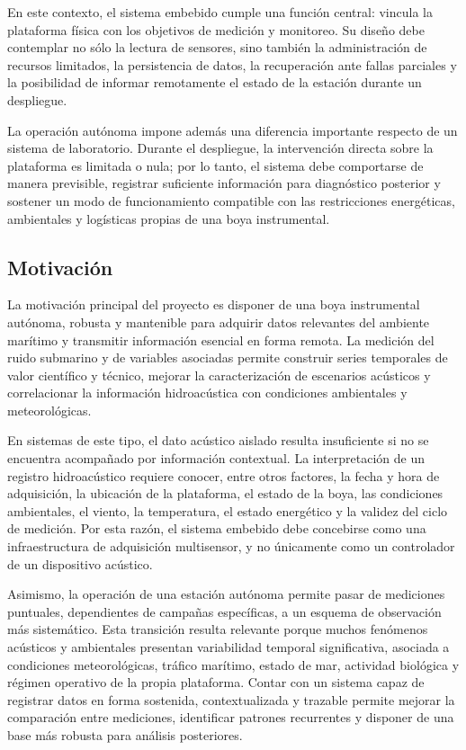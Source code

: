En este contexto, el sistema embebido cumple una función central: vincula la plataforma física con los objetivos de medición y monitoreo. Su diseño debe contemplar no sólo la lectura de sensores, sino también la administración de recursos limitados, la persistencia de datos, la recuperación ante fallas parciales y la posibilidad de informar remotamente el estado de la estación durante un despliegue.

La operación autónoma impone además una diferencia importante respecto de un sistema de laboratorio. Durante el despliegue, la intervención directa sobre la plataforma es limitada o nula; por lo tanto, el sistema debe comportarse de manera previsible, registrar suficiente información para diagnóstico posterior y sostener un modo de funcionamiento compatible con las restricciones energéticas, ambientales y logísticas propias de una boya instrumental.


\subsection{Motivación}
\label{subsec:motivacion}

La motivación principal del proyecto es disponer de una boya instrumental autónoma, robusta y mantenible para adquirir datos relevantes del ambiente marítimo y transmitir información esencial en forma remota. La medición del ruido submarino y de variables asociadas permite construir series temporales de valor científico y técnico, mejorar la caracterización de escenarios acústicos y correlacionar la información hidroacústica con condiciones ambientales y meteorológicas.

En sistemas de este tipo, el dato acústico aislado resulta insuficiente si no se encuentra acompañado por información contextual. La interpretación de un registro hidroacústico requiere conocer, entre otros factores, la fecha y hora de adquisición, la ubicación de la plataforma, el estado de la boya, las condiciones ambientales, el viento, la temperatura, el estado energético y la validez del ciclo de medición. Por esta razón, el sistema embebido debe concebirse como una infraestructura de adquisición multisensor, y no únicamente como un controlador de un dispositivo acústico.

Asimismo, la operación de una estación autónoma permite pasar de mediciones puntuales, dependientes de campañas específicas, a un esquema de observación más sistemático. Esta transición resulta relevante porque muchos fenómenos acústicos y ambientales presentan variabilidad temporal significativa, asociada a condiciones meteorológicas, tráfico marítimo, estado de mar, actividad biológica y régimen operativo de la propia plataforma. Contar con un sistema capaz de registrar datos en forma sostenida, contextualizada y trazable permite mejorar la comparación entre mediciones, identificar patrones recurrentes y disponer de una base más robusta para análisis posteriores.

